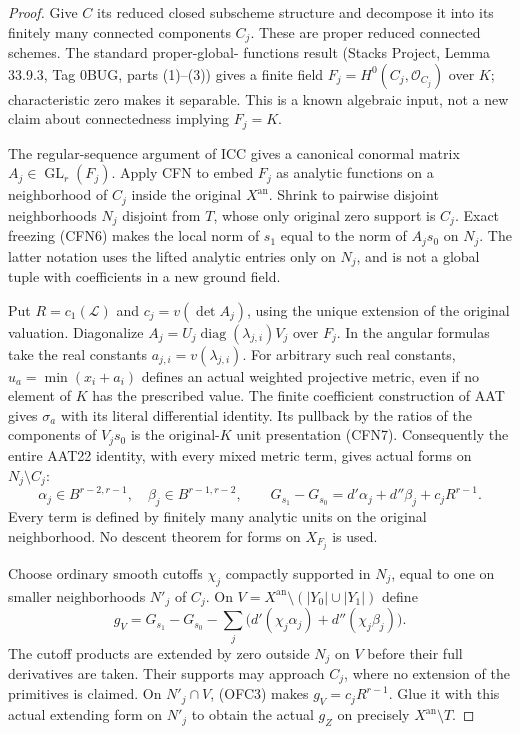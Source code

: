 \begin{proof}
Give $C$ its reduced closed subscheme structure and decompose it
into its finitely many connected components $C_j$.  These are
proper reduced connected schemes.  The standard proper-global-
functions result (Stacks Project, Lemma 33.9.3, Tag 0BUG,
parts (1)--(3)) gives a finite field
$F_j=H^0(C_j,\mathcal O_{C_j})$ over $K$; characteristic zero
makes it separable.  This is a known algebraic input, not a new
claim about connectedness implying $F_j=K$.

The regular-sequence argument of ICC gives a canonical conormal
matrix $A_j\in\operatorname{GL}_r(F_j)$.  Apply CFN to embed
$F_j$ as analytic functions on a neighborhood of $C_j$ inside
the original $X^{\mathrm{an}}$.  Shrink to pairwise disjoint
neighborhoods $N_j$ disjoint from $T$, whose only original
zero support is $C_j$.  Exact freezing (CFN6) makes the local
norm of $s_1$ equal to the norm of $A_js_0$ on $N_j$.
The latter notation uses the lifted analytic entries only on
$N_j$, and is not a global tuple with coefficients in a
new ground field.

Put $R=c_1(\mathcal L)$ and $c_j=v(\det A_j)$, using the
unique extension of the original valuation.  Diagonalize
$A_j=U_j\operatorname{diag}(\lambda_{j,i})V_j$ over $F_j$.
In the angular formulas take the real constants
$a_{j,i}=v(\lambda_{j,i})$.  For arbitrary such real constants,
$u_a=\min(x_i+a_i)$ defines an actual weighted projective
metric, even if no element of $K$ has the prescribed value.
The finite coefficient construction of AAT gives
$\sigma_a$ with its literal differential identity.  Its
pullback by the ratios of the components of $V_js_0$ is
the original-$K$ unit presentation (CFN7).
Consequently the entire AAT22 identity, with every mixed
metric term, gives actual forms on $N_j\setminus C_j$:
\[
 \alpha_j\in B^{r-2,r-1},\quad
 \beta_j\in B^{r-1,r-2},\qquad
 G_{s_1}-G_{s_0}=d'\alpha_j+d''\beta_j+c_jR^{r-1}.
 \tag{OFC3}
\]
Every term is defined by finitely many analytic units on the
original neighborhood.  No descent theorem for forms on
$X_{F_j}$ is used.

Choose ordinary smooth cutoffs $\chi_j$ compactly supported
in $N_j$, equal to one on smaller neighborhoods $N'_j$ of
$C_j$.  On
$V=X^{\mathrm{an}}\setminus(|Y_0|\cup|Y_1|)$ define
\[
 g_V=G_{s_1}-G_{s_0}
       -\sum_j\bigl(d'(\chi_j\alpha_j)+d''(\chi_j\beta_j)\bigr).
 \tag{OFC4}
\]
The cutoff products are extended by zero outside $N_j$ on
$V$ before their full derivatives are taken.  Their supports
may approach $C_j$, where no extension of the primitives is
claimed.  On $N'_j\cap V$, (OFC3) makes $g_V=c_jR^{r-1}$.
Glue it with this actual extending form on $N'_j$ to obtain
the actual $g_Z$ on precisely $X^{\mathrm{an}}\setminus T$.


\end{proof}
